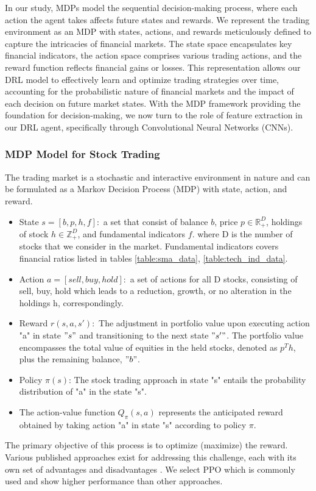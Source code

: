 In our study, MDPs model the sequential decision-making process, where each action the agent takes affects future states and rewards. We represent the trading environment as an MDP with states, actions, and rewards meticulously defined to capture the intricacies of financial markets. The state space encapsulates key financial indicators, the action space comprises various trading actions, and the reward function reflects financial gains or losses. This representation allows our DRL model to effectively learn and optimize trading strategies over time, accounting for the probabilistic nature of financial markets and the impact of each decision on future market states.  With the MDP framework providing the foundation for decision-making, we now turn to the role of feature extraction in our DRL agent, specifically through Convolutional Neural Networks (CNNs).

\subsubsection{MDP Model for Stock Trading}
The trading market is a stochastic and interactive environment in nature and can be formulated as a Markov Decision Process (MDP) with state, action, and reward.
\begin{itemize}
    \item State $s=[b, p, h, f]:$ a set that consist of balance $b$, price $p \in \mathbb{R}_+^D$, holdings of stock $h\in \mathbb{Z}_+^D$, and fundamental indicators $f$. where D is the number of stocks that we consider in the market. Fundamental indicators covers financial ratios listed in tables \ref{table:sma_data}, \ref{table:tech_ind_data}.
    \item Action $a=[sell, buy, hold]:$ a set of actions for all D stocks, consisting of sell, buy, hold which leads to a reduction, growth, or no alteration in the holdings h, correspondingly.
    \item Reward $r(s, a, s'):$ The adjustment in portfolio value upon executing action "a" in state $"s"$ and transitioning to the next state $"s'"$. The portfolio value encompasses the total value of equities in the held stocks, denoted as $p^Th$, plus the remaining balance, $"b"$.
    \item Policy $\pi(s)$: The stock trading approach in state "s" entails the probability distribution of "a" in the state "s".
    \item The action-value function $Q_\pi(s, a)$
    represents the anticipated reward obtained by taking action "a" in state "s" according to policy $\pi$.
\end{itemize}
The primary objective of this process is to optimize (maximize) the reward. Various published approaches exist for addressing this challenge, each with its own set of advantages and disadvantages \cite{sutton2018reinforcement}. We select PPO  which is commonly used and show higher performance than other approaches.

